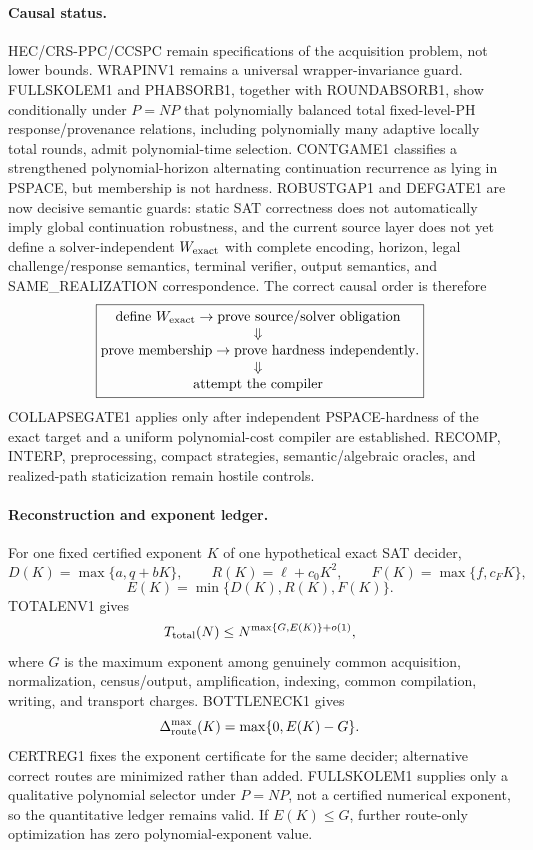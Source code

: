 \documentclass[11pt]{article}
\begin{document}
\paragraph{Causal status.}
HEC/CRS-PPC/CCSPC remain specifications of the acquisition problem, not lower bounds.
WRAPINV1 remains a universal wrapper-invariance guard. FULLSKOLEM1 and PHABSORB1,
together with ROUNDABSORB1, show conditionally under \(P=NP\) that polynomially
balanced total fixed-level-PH response/provenance relations, including polynomially many
adaptive locally total rounds, admit polynomial-time selection. CONTGAME1 classifies a
strengthened polynomial-horizon alternating continuation recurrence as lying in PSPACE, but
membership is not hardness. ROBUSTGAP1 and DEFGATE1 are now decisive semantic guards:
static SAT correctness does not automatically imply global continuation robustness, and the
current source layer does not yet define a solver-independent \(W_{\rm exact}\) with complete
encoding, horizon, legal challenge/response semantics, terminal verifier, output semantics,
and SAME\_REALIZATION correspondence. The correct causal order is therefore
\[
\boxed{
\begin{gathered}
\text{define }W_{\rm exact}\to\text{prove source/solver obligation}
\\[-1mm]\Downarrow\\[-1mm]
\text{prove membership}\to\text{prove hardness independently}
\\[-1mm]\Downarrow\\[-1mm]
\text{attempt the compiler}
\end{gathered}.}
\]
COLLAPSEGATE1 applies only after independent PSPACE-hardness of the exact target and a
uniform polynomial-cost compiler are established. RECOMP, INTERP, preprocessing, compact
strategies, semantic/algebraic oracles, and realized-path staticization remain hostile controls.

\paragraph{Reconstruction and exponent ledger.}
For one fixed certified exponent \(K\) of one hypothetical exact SAT decider,
\[
D(K)=\max\{a,q+bK\},\qquad
R(K)=\ell+c_0K^2,\qquad
F(K)=\max\{f,c_FK\},
\]
\[
E(K)=\min\{D(K),R(K),F(K)\}.
\]
TOTALENV1 gives
\[
T_{\rm total}(N)\le N^{\max\{G,E(K)\}+o(1)},
\]
where \(G\) is the maximum exponent among genuinely common acquisition, normalization,
census/output, amplification, indexing, common compilation, writing, and transport charges.
BOTTLENECK1 gives
\[
\Delta_{\rm route}^{\max}(K)=\max\{0,E(K)-G\}.
\]
CERTREG1 fixes the exponent certificate for the same decider; alternative correct routes are
minimized rather than added. FULLSKOLEM1 supplies only a qualitative polynomial selector
under \(P=NP\), not a certified numerical exponent, so the quantitative ledger remains
valid. If \(E(K)\le G\), further route-only optimization has zero polynomial-exponent value.
\end{document}
